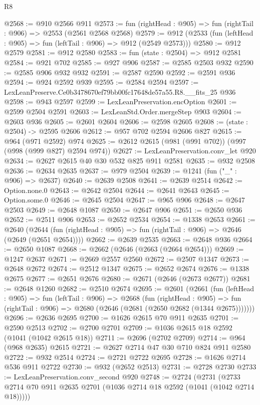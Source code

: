 \begin{lexlean}{R8}
\begin{coremodule}
@2568 := @910 @2566 @911
@2573 := fun (rightHead : @905) => fun (rightTail : @906) => @2553 (@2561 @2568 @2568)
@2579 := @912 (@2533 (fun (leftHead : @905) => fun (leftTail : @906) => @912 (@2549 @2573)))
@2580 := @912 @2579
@2581 := @912 @2580
@2583 := fun (state : @2504) => @912 @2581
@2584 := @921 @702
@2585 := @927 @906
@2587 := @2585 @2503 @932
@2590 := @2585 @906 @932 @932
@2591 := @2587 @2590
@2592 := @2591 @936
@2594 := @924 @2592 @939
@2595 := @2584 @2594
@2597 := LexLeanPreserve.Ce0b3478670ef79bb00fc17648de57a55.R8.__fits_25 @936
@2598 := @943 @2597
@2599 := LexLeanPreservation.encOption
@2601 := @2599 @2504 @2591
@2603 := LexLeanStd.Order.mergeStep @903
@2604 := @2603 @936
@2605 := @2601 @2604
@2606 := @2598 @2605
@2608 := (state : @2504) -> @2595 @2606
@2612 := @957 @702 @2594 @2606 @827
@2615 := @964 (@971 @2592) @974
@2625 := @2612 @2615 (@981 (@991 @702)) (@997 (@998 (@999 @827) @2594 @974))
@2627 := LexLeanPreservation.conv_let @920
@2634 := @2627 @2615 @40 @30 @532 @825 @911 @2581
@2635 := @932 @2508
@2636 := @2634 @2635
@2637 := @979 @2504
@2639 := @1241 (fun ("_" : @906) => @2637)
@2640 := @2639 @2508
@2641 := @2639 @2514
@2642 := Option.none.{0}
@2643 := @2642 @2504
@2644 := @2641 @2643
@2645 := Option.some.{0}
@2646 := @2645 @2504
@2647 := @965 @906
@2648 := @2647 @2503
@2649 := @2648 @1087
@2650 := @2647 @906
@2651 := @2650 @936
@2652 := @2511 @906
@2653 := @2652 @2534
@2654 := @1338 @2653
@2661 := @2640
    (@2644 (fun (rightHead : @905) => fun (rightTail : @906) => @2646 (@2649 (@2651 @2654))))
@2662 := @2639 @2535
@2663 := @2648 @936
@2664 := @2650 @1087
@2668 := @2662 (@2646 (@2663 (@2664 @2654)))
@2669 := @1247 @2637
@2671 := @2669 @2557 @2560
@2672 := @2507 @1347
@2673 := @2648 @2672
@2674 := @2512 @1347
@2675 := @2652 @2674
@2676 := @1338 @2675
@2677 := @2651 @2676
@2680 := @2671 (@2646 (@2673 @2677))
@2681 := @2648 @1260
@2682 := @2510 @2674
@2695 := @2601
    (@2661
      (fun (leftHead : @905) =>
      fun (leftTail : @906) =>
      @2668
        (fun (rightHead : @905) =>
        fun (rightTail : @906) => @2680 (@2646 (@2681 (@2650 @2682 (@1344 @2675)))))))
@2696 := @2636 @2695
@2700 := @1626 @2615 @70 @911 @2635
@2701 := @2590 @2513
@2702 := @2700 @2701
@2709 := @1036 @2615 @18 @2592 (@1041 (@1042 @2615 @18))
@2711 := @2696 (@2702 @2709)
@2714 := @964 (@968 @2635) @2615
@2721 := @2627 @2714 @47 @30 @710 @824 @911 @2580
@2722 := @932 @2514
@2724 := @2721 @2722 @2695
@2728 := @1626 @2714 @536 @911 @2722
@2730 := @932 (@2652 @2513)
@2731 := @2728 @2730
@2733 := LexLeanPreservation.conv_second @920
@2748 := @2724
    (@2731 (@2733 @2714 @70 @911 @2635 @2701 (@1036 @2714 @18 @2592 (@1041 (@1042 @2714 @18)))))

\end{coremodule}
\end{lexlean}
